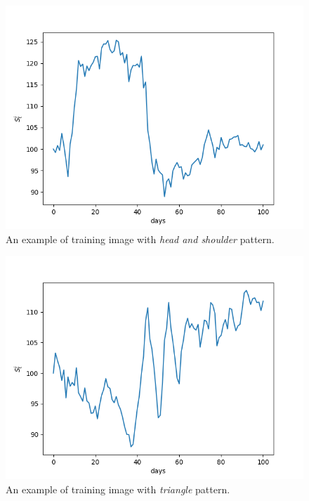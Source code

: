 \begin{figure}
	\centering
	\includegraphics[width=0.5\linewidth]{figures/image_2.png}
	\caption{An example of training image with \emph{head and shoulder} pattern.}
\end{figure}

\begin{figure}
	\centering
	\includegraphics[width=0.5\linewidth]{figures/image_0.png}
	\caption{An example of training image with \emph{triangle} pattern.}
\end{figure}

